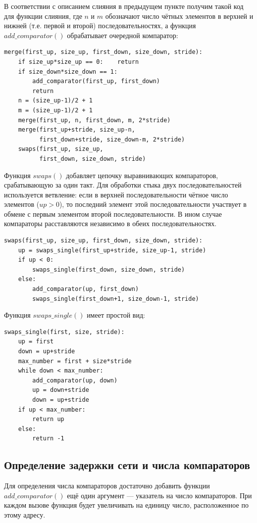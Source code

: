 \documentclass[14pt]{extarticle}
\begin{document}
В соответствии с описанием слияния в предыдущем пункте получим такой код для функции слияния, где $n$ и $m$ обозначают число чётных элементов в верхней и нижней (т.е. первой и второй) последовательностях, а функция $add\_comparator()$ обрабатывает очередной компаратор:
\begin{lstlisting}
merge(first_up, size_up, first_down, size_down, stride):
	if size_up*size_up == 0:	return
	if size_down*size_down == 1:
		add_comparator(first_up, first_down)
		return
	n = (size_up-1)/2 + 1
	m = (size_up-1)/2 + 1
	merge(first_up, n, first_down, m, 2*stride)
	merge(first_up+stride, size_up-n, 
		  first_down+stride, size_down-m, 2*stride)
	swaps(first_up, size_up,
		  first_down, size_down, stride)
\end{lstlisting}

Функция $swaps()$ добавляет цепочку выравнивающих компараторов, срабатывающую за один такт. Для обработки стыка двух последовательностей используется ветвление: если в верхней последовательности чётное число элементов ($up>0$), то последний элемент этой последовательности участвует в обмене с первым элементом второй последовательности. В ином случае компараторы расставляются независимо в обеих последовательностях.
\begin{lstlisting}
swaps(first_up, size_up, first_down, size_down, stride):
	up = swaps_single(first_up+stride, size_up-1, stride)
	if up < 0:
		swaps_single(first_down, size_down, stride)
	else:
		add_comparator(up, first_down)
		swaps_single(first_down+1, size_down-1, stride)
\end{lstlisting}

Функция $swaps\_single()$ имеет простой вид:
\begin{lstlisting}
swaps_single(first, size, stride):
	up = first
	down = up+stride
	max_number = first + size*stride
	while down < max_number:
		add_comparator(up, down)
		up = down+stride
		down = up+stride
	if up < max_number:
		return up
	else:
		return -1
\end{lstlisting}

\subsection{Определение задержки сети и числа компараторов}
Для определения числа компараторов достаточно добавить функции 
\\ $add\_comparator()$ ещё один аргумент --- указатель на число компараторов. При каждом вызове функция будет увеличивать на единицу число, расположенное по этому адресу.
\end{document}
